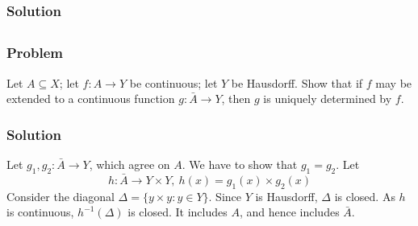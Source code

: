 \subsubsection{Solution}
\todo


\subsection{}

\subsubsection{Problem}
Let $A \subseteq X$; let $f : A \to Y$ be continuous; let $Y$ be Hausdorff. Show that if $f$ may be extended to a continuous function $g : \bar A \to Y$, then $g$ is uniquely determined by $f$.

\subsubsection{Solution}
Let $g_1, g_2 : \bar A \to Y$, which agree on $A$. We have to show that $g_1 = g_2$. Let
\[h : \bar A \to Y \times Y,\ h(x) = g_1(x) \times g_2(x) \]
Consider the diagonal $\Delta = \{ y \times y : y \in Y\}$. Since $Y$ is Hausdorff, $\Delta$ is closed. As $h$ is continuous, $h^{-1}(\Delta)$ is closed. It includes $A$, and hence includes $\bar A$.
